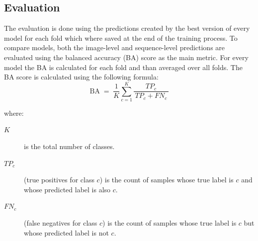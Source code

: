 
    \subsection{Evaluation}

    The evaluation is done using the predictions created by the best version of every model for each fold which where saved at the end of the training process.
    To compare models, both the image-level and sequence-level predictions are evaluated using the balanced accuracy (BA) score \autocite{brodersenBalancedAccuracyIts2010} as the main metric.
    For every model the BA is calculated for each fold and than averaged over all folds.
    The BA score is calculated using the following formula:
    \begin{equation}
    \text{BA}
    \;=\;
    \frac{1}{K} \sum_{c=1}^{K}
        \frac{TP_{c}}{\,TP_{c} + FN_{c}\,}
    \end{equation}

    \noindent where:
    \begin{description}
    \item[$K$] is the total number of classes.
    \item[$TP_{c}$] (true positives for class $c$) is the count of samples whose true label is $c$ and whose predicted label is also $c$.
    \item[$FN_{c}$] (false negatives for class $c$) is the count of samples whose true label is $c$ but whose predicted label is not $c$.
    \end{description}

